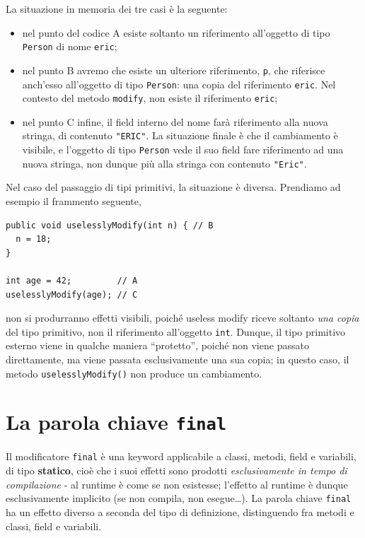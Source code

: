 \documentclass[\fontsizeclass,twocolumn]{\classname}
\theoremstyle{definition}
\theoremstyle{definition}
\begin{document}
La situazione in memoria dei tre casi è la seguente: 
\begin{itemize}
    \item nel punto del codice A esiste soltanto un riferimento all'oggetto di
        tipo \texttt{Person} di nome \texttt{eric};
    \item nel punto B avremo che esiste un ulteriore riferimento, \texttt{p},
        che riferisce anch'esso all'oggetto di tipo \texttt{Person}: una copia del
        riferimento \texttt{eric}. Nel contesto del metodo \texttt{modify}, non
        esiste il riferimento \texttt{eric};
    \item nel punto C infine, il field interno del nome farà riferimento alla
        nuova stringa, di contenuto \texttt{"ERIC"}. La situazione finale è che
        il cambiamento è visibile, e l'oggetto di tipo \texttt{Person} vede il
        suo field fare riferimento ad una nuova stringa, non dunque più alla
        stringa con contenuto \texttt{"Eric"}.
\end{itemize}

Nel caso del passaggio di tipi primitivi, la situazione è diversa. Prendiamo ad
esempio il frammento seguente,

\begin{lstlisting}
public void uselesslyModify(int n) { // B
  n = 18;
}

int age = 42;         // A
uselesslyModify(age); // C
\end{lstlisting}

non si produrranno effetti visibili, poiché useless modify riceve soltanto
\emph{una copia} del tipo primitivo, non il riferimento all'oggetto
\texttt{int}. Dunque, il tipo primitivo esterno viene in qualche maniera
``protetto'', poiché non viene passato direttamente, ma viene passata
esclusivamente una sua copia; in questo caso, il metodo
\texttt{uselesslyModify()} non produce un cambiamento.

\section{La parola chiave \texttt{final}}

Il modificatore \texttt{final} è una keyword applicabile a classi, metodi,
field e variabili, di tipo \textbf{statico}, cioè che i suoi effetti sono
prodotti \emph{esclusivamente in tempo di compilazione} \-- al runtime è come
se non esistesse; l'effetto al runtime è dunque esclusivamente implicito (se
non compila, non esegue\dots). La parola chiave \texttt{final} ha un effetto
diverso a seconda del tipo di definizione, distinguendo fra metodi e classi,
field e variabili.
\end{document}
